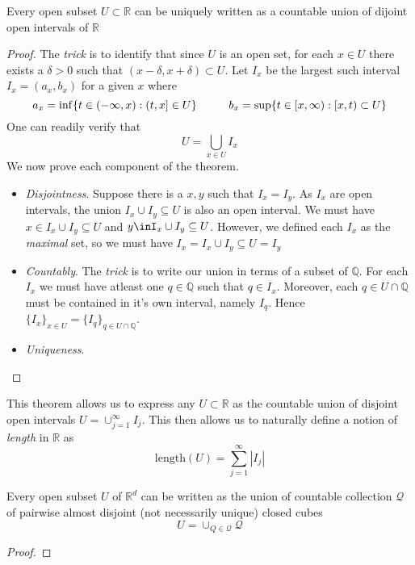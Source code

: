 \begin{theorem}
    Every open subset $U\subset\mathbb{R}$ can be uniquely written as a countable union of dijoint open intervals of $\mathbb{R}$    
\end{theorem}
\begin{proof}
    The \textit{trick} is to identify that since $U$ is an open set, for each $x\in  U$ there exists a $\delta>0$ such that $(x-\delta, x+\delta)\subset U$. Let $I_x$ be the largest such interval $I_x = (a_x, b_x)$ for a given $x$ where
    $$a_x = \inf\{t\in(-\infty, x) : (t, x]\in U\} \hspace{10mm} b_x = \sup\{t\in[x,\infty): [x, t)\subset U\}$$
    One can readily verify that 
    $$U = \bigcup_{x\in U}I_x$$
    We now prove each component of the theorem. \begin{itemize}
        \item \textit{Disjointness}. Suppose there is a $x,y$ such that $I_x = I_y$. As $I_x$ are open intervals, the union $I_x \cup I_y \subseteq U$ is also an open interval. We must have $x\in I_x \cup I_y \subseteq U$ and $y\inI_x \cup I_y \subseteq U$. However, we defined each $I_x$ as the \textit{maximal} set, so we must have $I_x = I_x \cup I_y \subseteq U = I_y$ 
        
        \item \textit{Countably}. The \textit{trick} is to write our union in terms of a subset of $\mathbb{Q}$. For each $I_x$ we must have atleast one $q\in\mathbb{Q}$ such that $q\in I_x$. Moreover, each $q\in U\cap\mathbb{Q}$ must be contained in it's own interval, namely $I_q$. Hence $\{I_x\}_{x\in U} = \{I_q\}_{q\in U\cap\mathbb{Q}}$.

        \item \textit{Uniqueness}.
    \end{itemize}
    
\end{proof}
\begin{remark}
This theorem allows us to express any $U\subset\mathbb{R}$ as the countable union of disjoint open intervals $U = \cup_{j=1}^{\infty} I_j$. This then allows us to naturally define a notion of \textit{length} in $\mathbb{R}$ as 
$$\text{length}(U) = \sum_{j=1}^{\infty}|I_j|$$
\end{remark}

\begin{theorem}
    Every open subset $U$ of $\mathbb{R}^d$ can be written as the union of countable collection $\mathcal{Q}$ of pairwise almost disjoint (not necessarily unique) closed cubes
    $$U = \cup_{Q\in\mathcal{Q}}\mathcal{Q}$$
\end{theorem}
\begin{proof}
    
\end{proof}
